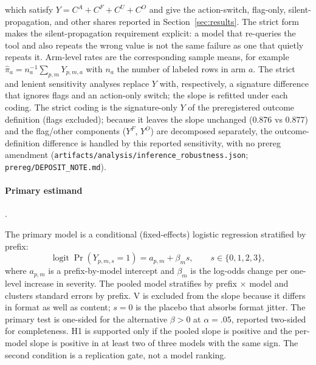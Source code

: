 \documentclass[a4paper,fleqn]{cas-sc}
\begin{document}
which satisfy $Y=C^{A}+C^{F}+C^{U}+C^{O}$ and give the action-switch, flag-only,
silent-propagation, and other shares reported in Section~\ref{sec:results}. The strict form makes
the silent-propagation requirement explicit: a model that re-queries the tool and also repeats the
wrong value is not the same failure as one that quietly repeats it. Arm-level rates are the
corresponding sample means, for example
$\hat\pi_a=n_a^{-1}\sum_{p,m}Y_{p,m,a}$ with $n_a$ the number of labeled rows in arm $a$. The
strict and lenient sensitivity analyses replace $Y$ with, respectively, a signature difference
that ignores flags and an action-only switch; the slope is refitted under each coding. The
strict coding is the signature-only $Y$ of the preregistered outcome definition (flags
excluded); because it leaves the slope unchanged (0.876 vs 0.877) and the flag/other
components ($Y^{F}$, $Y^{O}$) are decomposed separately, the outcome-definition difference is
handled by this reported sensitivity, with no prereg amendment
(\texttt{artifacts/analysis/inference\_robustness.json};
\texttt{prereg/DEPOSIT\_NOTE.md}).

\paragraph{Primary estimand}.\

The primary model is a conditional (fixed-effects) logistic regression stratified by prefix:
\begin{equation}
  \operatorname{logit}\Pr(Y_{p,m,s}=1) = a_{p,m} + \beta_m s,
  \qquad s \in \{0,1,2,3\},
  \label{eq:primary}
\end{equation}
where $a_{p,m}$ is a prefix-by-model intercept and $\beta_m$ is the log-odds change per
one-level increase in severity. The pooled model stratifies by prefix $\times$ model and clusters
standard errors by prefix. V is excluded from the slope because it differs in format as well as
content; $s=0$ is the placebo that absorbs format jitter. The primary test is one-sided
for the alternative $\beta>0$ at $\alpha=.05$, reported two-sided for completeness. H1 is supported only if the
pooled slope is positive and the per-model slope is positive in at least two of three models with
the same sign. The second condition is a replication gate, not a model ranking.
\end{document}
